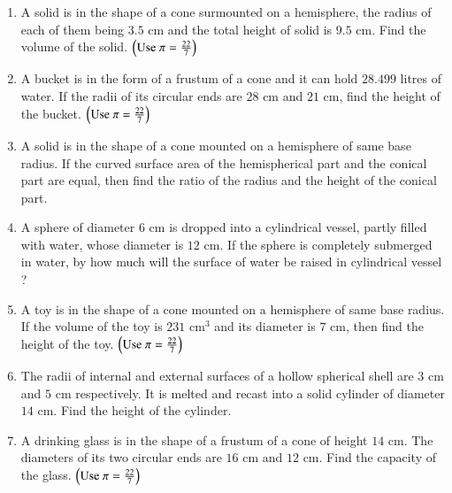 \documentclass[journal,12pt,onecolumn]{IEEEtran}
\theoremstyle{remark}
\begin{document}
\begin{enumerate}
\item A solid is in the shape of a cone surmounted on a hemisphere, the radius of each of them being $3.5\text{ cm}$ and the total height of solid is $9.5\text{ cm}$. Find the volume of the solid. $\left(\text{Use } \pi = \frac{22}{7}\right)$\\

\item A bucket is in the form of a frustum of a cone and it can hold $28.499$ litres of water. If the radii of its circular ends are $28\text{ cm}$ and $21\text{ cm}$, find the height of the bucket. $\left(\text{Use } \pi = \frac{22}{7}\right)$\\


\item A solid is in the shape of a cone mounted on a hemisphere of same base radius. If the curved surface area of the hemispherical part and the conical part are equal, then find the ratio of the radius and the height of the conical part.\\

\item A sphere of diameter $6\text{ cm}$ is dropped into a cylindrical vessel, partly filled with water, whose diameter is $12\text{ cm}$. If the sphere is completely submerged in water, by how much will the surface of water be raised in cylindrical vessel ?\\
\item A toy is in the shape of a cone mounted on a hemisphere of same base radius. If the volume of the toy is $231\text{ cm}^3$ and its diameter is $7\text{ cm}$, then find the height of the toy.  $\left(\text{Use } \pi = \frac{22}{7}\right)$\\

\item The radii of internal and external surfaces of a hollow spherical shell are $3\text{ cm}$ and $5\text{ cm}$ respectively. It is melted and recast into a solid cylinder of diameter $14\text{ cm}$. Find the height of the cylinder.\\

\item A drinking glass is in the shape of a frustum of a cone of height $14\text{ cm}$. The diameters of its two circular ends are $16\text{ cm}$ and $12\text{ cm}$. Find the capacity of the glass. $\left(\text{Use } \pi = \frac{22}{7}\right)$\\

\end{enumerate}
\end{document}
